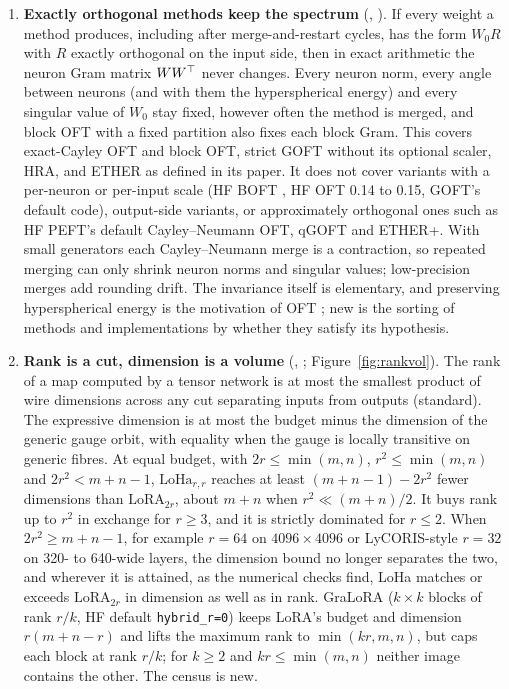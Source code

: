 \begin{enumerate}[label=\textbf{\arabic*.},leftmargin=1.9em]
\item \textbf{Exactly orthogonal methods keep the spectrum} (, ). If every weight a method produces, including after merge-and-restart cycles, has the form $W_0R$ with $R$ exactly orthogonal on the input side, then in exact arithmetic the neuron Gram matrix $WW^{\top}$ never changes. Every neuron norm, every angle between neurons (and with them the hyperspherical energy) and every singular value of $W_0$ stay fixed, however often the method is merged, and block OFT with a fixed partition also fixes each block Gram. This covers exact-Cayley OFT \citep{qiu2023controlling} and block OFT, strict GOFT \citep{ma2024parameter} without its optional scaler, HRA, and ETHER \citep{bini2024ether} as defined in its paper. It does not cover variants with a per-neuron or per-input scale (HF BOFT \citep{liu2023parameter}, HF OFT 0.14 to 0.15, GOFT's default code), output-side variants, or approximately orthogonal ones such as HF PEFT's default Cayley--Neumann OFT, qGOFT and ETHER+. With small generators each Cayley--Neumann merge is a contraction, so repeated merging can only shrink neuron norms and singular values; low-precision merges add rounding drift. The invariance itself is elementary, and preserving hyperspherical energy is the motivation of OFT \citep{qiu2023controlling}; new is the sorting of methods and implementations by whether they satisfy its hypothesis.

\item \textbf{Rank is a cut, dimension is a volume} (, ; Figure~\ref{fig:rankvol}). The rank of a map computed by a tensor network is at most the smallest product of wire dimensions across any cut separating inputs from outputs (standard). The expressive dimension is at most the budget minus the dimension of the generic gauge orbit, with equality when the gauge is locally transitive on generic fibres. At equal budget, with $2r\le\min(m,n)$, $r^2\le\min(m,n)$ and $2r^2<m+n-1$, $\mathrm{LoHa}_{r,r}$ \citep{hyeonwoo2021fedpara} reaches at least $(m+n-1)-2r^2$ fewer dimensions than $\mathrm{LoRA}_{2r}$, about $m+n$ when $r^2\ll(m+n)/2$. It buys rank up to $r^2$ in exchange for $r\ge3$, and it is strictly dominated for $r\le2$. When $2r^2\ge m+n-1$, for example $r=64$ on $4096\times4096$ or LyCORIS-style $r=32$ on 320- to 640-wide layers, the dimension bound no longer separates the two, and wherever it is attained, as the numerical checks find, LoHa matches or exceeds $\mathrm{LoRA}_{2r}$ in dimension as well as in rank. GraLoRA \citep{jung2025gralora} ($k\times k$ blocks of rank $r/k$, HF default \texttt{hybrid\_r=0}) keeps LoRA's budget and dimension $r(m+n-r)$ and lifts the maximum rank to $\min(kr,m,n)$, but caps each block at rank $r/k$; for $k\ge2$ and $kr\le\min(m,n)$ neither image contains the other. The census is new.


\end{enumerate}
